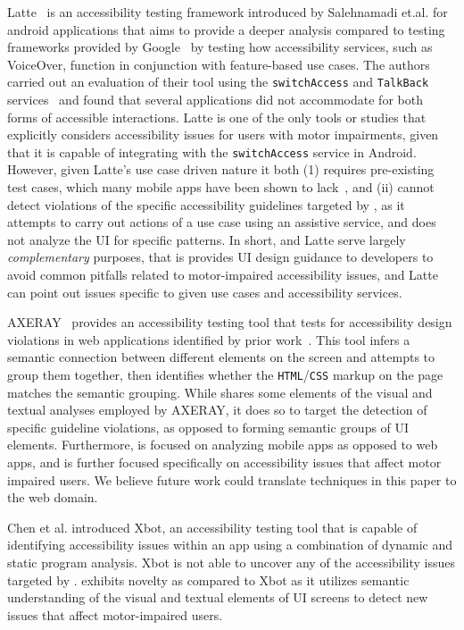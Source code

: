 Latte~\cite{Salehnamadi21} is an accessibility testing framework introduced by Salehnamadi et.al. for android applications that aims to provide a deeper analysis compared to testing frameworks provided by Google~\cite{ANDRDesign, GoogleAccess} by testing how accessibility services, such as VoiceOver, function in conjunction with feature-based use cases. The authors carried out an evaluation of their tool using the \texttt{\small switchAccess} and \texttt{\small TalkBack} services~\cite{AppleAccess, GoogleAccess} and found that several applications did not accommodate for both forms of accessible interactions. Latte is one of the only tools or studies that explicitly considers accessibility issues for users with motor impairments, given that it is capable of integrating with the \texttt{\small switchAccess} service in Android. However, given Latte's use case driven nature it both (1) requires pre-existing test cases, which many mobile apps have been shown to lack~\cite{Lin:ASE'20}, and (ii) cannot detect violations of the specific accessibility guidelines targeted by \MotorEase, as it attempts to carry out actions of a use case using an assistive service, and does not analyze the UI for specific patterns.  In short, \MotorEase and Latte serve largely \textit{complementary} purposes, that is \MotorEase provides UI design guidance to developers to avoid common pitfalls related to motor-impaired accessibility issues, and Latte can point out issues specific to given use cases and accessibility services. 

AXERAY~\cite{axeray} provides an accessibility testing tool that tests for accessibility design violations in web applications identified by prior work~\cite{Li22, Silva19, Almeida10}. This tool infers a semantic connection between different elements on the screen and attempts to group them together, then identifies whether the \texttt{\small HTML}/\texttt{\small CSS} markup on the page matches the semantic grouping. While \MotorEase shares some elements of the visual and textual analyses employed by AXERAY, it does so to target the detection of specific guideline violations, as opposed to forming semantic groups of UI elements. Furthermore, \MotorEase is focused on analyzing mobile apps as opposed to web apps, and is further focused specifically on accessibility issues that affect motor impaired users. We believe future work could translate techniques in this paper to the web domain.  

Chen et al. \cite{Chen22} introduced Xbot, an accessibility testing tool that is capable of identifying accessibility issues within an app using a combination of dynamic and static program analysis. Xbot is not able to uncover any of the accessibility issues targeted by \MotorEase. \MotorEase exhibits novelty as compared to Xbot as it  utilizes semantic understanding of the visual and textual elements of UI screens to detect new issues that affect motor-impaired users. 

